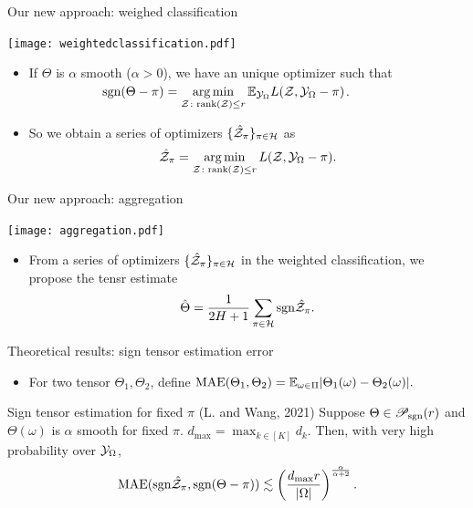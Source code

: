 \documentclass[10pt, mathserif]{beamer} %
\theoremstyle{definition}
\theoremstyle{plain}
\def\caliP{\mathscr{P}_{\textup{sgn}}}
\begin{document}
\begin{frame}{Our new approach: weighed classification}
 \begin{center}
 \texttt{[image: weightedclassification.pdf]}
 \end{center}
   \begin{itemize}
    \item If $\Theta$ is $\alpha$ smooth ($\alpha>0$), we have {\color{red}an unique optimizer}  such that\\[.1cm]
       $\hspace{2cm}\text{sgn}(\Theta-\pi) = \operatorname*{arg\,min}\limits_{\mathcal{Z}\colon \text{rank}(\mathcal{Z})\leq r} \mathbb{E}_{\mathcal{Y}_\Omega}L(\mathcal{Z},\mathcal{Y}_\Omega-\pi)$.\vspace*{.1cm}

    \item So we obtain a series of optimizers $\{\hat {\mathcal{Z}}_\pi\}_{\pi\in\mathcal{H}}$ as
    \begin{align}
        \hat {\mathcal{Z}}_\pi = \operatorname*{arg\,min}_{\mathcal{Z}\colon \text{rank}(\mathcal{Z})\leq r}L(\mathcal{Z},\mathcal{Y}_\Omega-\pi).
    \end{align}
    \end{itemize}
\end{frame}

\begin{frame}{Our new approach: aggregation}
    \begin{center}
    \texttt{[image: aggregation.pdf]}
    \end{center}
    \begin{itemize}
    \item From a series of optimizers $\{\hat{\mathcal{Z}}_\pi\}_{\pi\in\mathcal{H}}$ in the weighted classification, we propose the tensr estimate 
    \begin{align}
        \hat\Theta = {1\over 2H+1}\sum_{\pi\in\mathcal{H}}\text{sgn}\hat {\mathcal{Z}}_\pi.
    \end{align}
    \end{itemize}
\end{frame}


\begin{frame}{Theoretical results: sign tensor estimation error}
\begin{itemize}
\item For two tensor $\Theta_1,\Theta_2$, define $\textup{MAE}(\Theta_1,\Theta_2) = \mathbb{E}_{\omega\in\Pi}|\Theta_1(\omega)-\Theta_2(\omega)|.$
\end{itemize}
    \begin{block}{Sign tensor estimation for fixed $\pi$ (L. and Wang, 2021)}
    Suppose $\Theta\in\caliP(r)$ and  $\Theta(\omega)$ is $\alpha$ smooth for fixed $\pi$. $d_{\max}=\max_{k\in[K]} d_k$. Then, with very high probability over $\mathcal{Y}_\Omega$, 
\begin{align}
\textup{MAE}(\text{sgn}\hat {\mathcal{Z}}_\pi, \text{sgn}(\Theta-\pi)) \lesssim  \left({d_{\max} r\over |\Omega|}\right)^{\alpha\over \alpha+2}.
\end{align}
    \end{block}
\end{frame}
\end{document}
